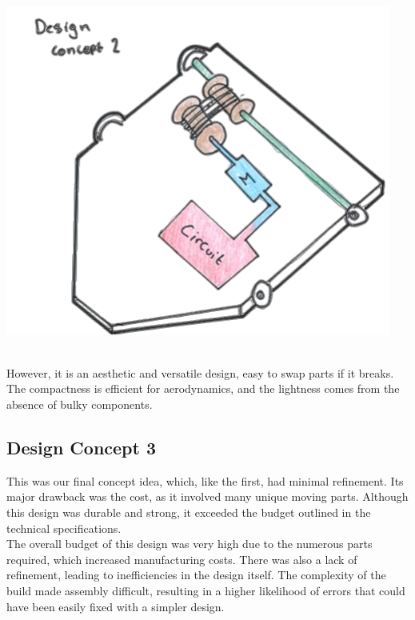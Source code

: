 \documentclass{article}
\begin{document}
\begin{minipage}{0.35\textwidth}
	\centering
	\includegraphics[width=0.95\textwidth]{images/image_7_2-Photoroom.png}
\end{minipage}\\[4pt]
However, it is an aesthetic and versatile design, easy to swap parts if it breaks. The compactness is efficient for aerodynamics, and the lightness comes from the absence of bulky components.\\[1em]
\begin{minipage}{0.59\textwidth}
	\subsection{Design Concept 3}
	This was our final concept idea, which, like the first, had minimal refinement. Its major drawback was the cost, as it involved many unique moving parts. Although this design was durable and strong, it exceeded the budget outlined in the technical specifications.\\[8pt]
	The overall budget of this design was very high due to the numerous parts required, which increased manufacturing costs. There was also a lack of refinement, leading to inefficiencies in the design itself. The complexity of the build made assembly difficult, resulting in a higher likelihood of errors that could have been easily fixed with a simpler design. 
\end{minipage}\hfill
\end{document}
